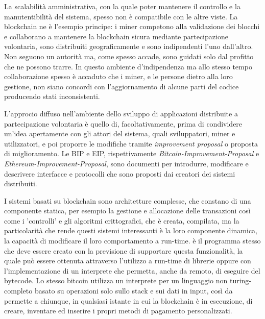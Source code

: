	La scalabilità amministrativa, con la quale poter mantenere il controllo e la manutentibilità del sistema, spesso non è compatibile con le altre viste. La blockchain ne è l'esempio principe: i miner competono alla validazione dei blocchi e collaborano a mantenere la blockchain sicura mediante partecipazione volontaria, sono distribuiti geograficamente e sono indipendenti l'uno dall'altro. Non seguono un autorità ma, come spesso accade, sono guidati solo dal profitto che ne possono trarre. In questo ambiente d'indipendenza ma allo stesso tempo collaborazione spesso è accaduto che i miner, e le persone dietro alla loro gestione, non siano concordi con l'aggiornamento di alcune parti del codice producendo stati inconsistenti.
	
	L'approcio diffuso nell'ambiente dello sviluppo di applicazioni distribuite a partecipazione volontaria è quello di, facoltativamente, prima di condividere un'idea apertamente con gli attori del sistema, quali sviluppatori, miner e utilizzatori, e poi proporre le modifiche tramite \textit{improvement proposal} o proposta di miglioramento. Le BIP e EIP, rispettivamente \textit{Bitcoin-Improvement-Proposal} e \textit{Ethereum-Improvement-Proposal}, sono documenti per introdurre, modificare e descrivere interfacce e protocolli che sono proposti dai creatori dei sistemi distribuiti.
	
	I sistemi basati su blockchain sono architetture complesse, che constano di una componente statica, per esempio la gestione e allocazione delle transazioni così come i 'controlli' e gli algoritmi crittografici, che è creata, compilata, ma la particolarità che rende questi sistemi interessanti è la loro componente dinamica, la capacità di modificare il loro comportamento a run-time. 
	è il programma stesso che deve essere creato con la previsione di supportare questa funzionalità, la quale può essere ottenuta attraverso l'utilizzo a run-time di librerie oppure con l'implementazione di un interprete che permetta, anche da remoto, di eseguire del bytecode. Lo stesso bitcoin utilizza un interprete per un linguaggio non turing-completo basato su operazioni solo sullo stack e sui dati in input, così da permette a chiunque, in qualsiasi istante in cui la blockchain è in esecuzione, di creare, inventare ed inserire i propri metodi di pagamento personalizzati\cite{bonneau2015sok}.
	
